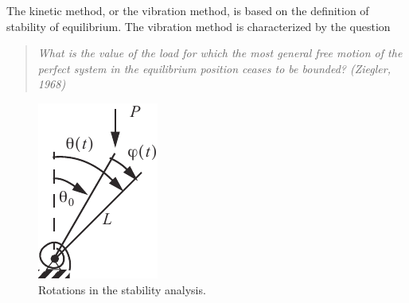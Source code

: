 \documentclass{AeroStructure-ERJohnson}
\begin{document}
The kinetic method, or the vibration method, is based on the definition of stability of equilibrium. The vibration method is characterized by the question
\begin{quote}
\textit{What is the value of the load for which the most general free motion of the perfect system in the equilibrium position ceases to be bounded? (Ziegler, 1968)}
\end{quote}
\begin{figure}
\vspace{10pt}
\includegraphics{Figure_10-4.pdf}
\caption{Rotations in the stability analysis.\label{fig10.4}}
\end{figure}
\end{document}
